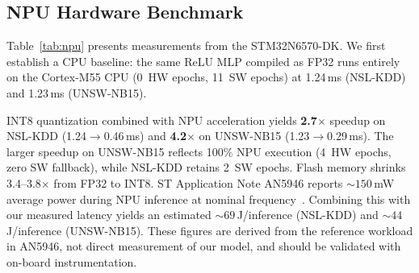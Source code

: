 \documentclass[10pt,twocolumn]{article}
\begin{document}
\subsection{NPU Hardware Benchmark}
\label{sec:npu}

\begin{table}[t]
\centering
\caption{Hardware benchmark on STM32N6570-DK (Cortex-M55 @ 800\,MHz +
Neural-ART NPU). HW = NPU-only epochs, Hyb = mixed, SW = CPU-only.}
\label{tab:npu}
\small
{}
\end{table}

Table~\ref{tab:npu} presents measurements from the STM32N6570-DK.
We first establish a CPU baseline: the same ReLU MLP compiled as FP32
runs entirely on the Cortex-M55 CPU (0~HW epochs, 11~SW epochs) at
1.24\,ms (NSL-KDD) and 1.23\,ms (UNSW-NB15).

INT8 quantization combined with NPU acceleration yields
\textbf{2.7$\times$} speedup on NSL-KDD (1.24$\to$0.46\,ms) and
\textbf{4.2$\times$} on UNSW-NB15 (1.23$\to$0.29\,ms).
The larger speedup on UNSW-NB15 reflects 100\% NPU execution
(4~HW epochs, zero SW fallback), while NSL-KDD retains 2~SW epochs.
Flash memory shrinks 3.4--3.8$\times$ from FP32 to INT8.
ST Application Note AN5946 reports ${\sim}150$\,mW average power during
NPU inference at nominal frequency~\cite{st_an5946}.
Combining this with our measured latency yields an estimated
${\sim}69$\,\textmu J/inference (NSL-KDD) and
${\sim}44$\,\textmu J/inference (UNSW-NB15).
These figures are derived from the reference workload in AN5946, not
direct measurement of our model, and should be validated with
on-board instrumentation.
\end{document}
